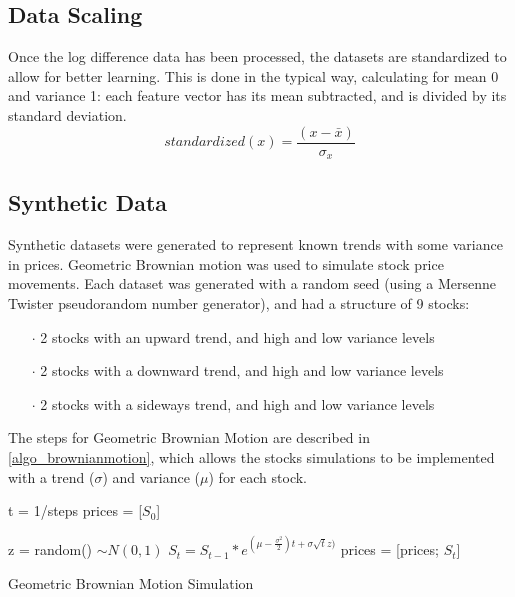 \documentclass[a4paper,latin]{paper}
\begin{document}
\subsection{Data Scaling}\label{data_scaling}
Once the log difference data has been processed, the datasets are standardized to allow for better learning. This is done in the typical way, calculating for mean 0 and variance 1: each feature vector has its mean subtracted, and is divided by its standard deviation.
\begin{equation}
\textit{standardized}(x) = \frac{(x - \bar{x}) }{\sigma_x}
\end{equation}

\subsection{Synthetic Data}\label{data_synthetic}

Synthetic datasets were generated to represent known trends with some variance in prices. Geometric Brownian motion was used to simulate stock price movements. Each dataset was generated with a random seed (using a Mersenne Twister pseudorandom number generator), and had a structure of 9 stocks:

\begin{itemize}
	\item [$\cdot$] 2 stocks with an upward trend, and high and low variance levels
	\item [$\cdot$] 2 stocks with a downward trend, and high and low variance levels
	\item [$\cdot$] 2 stocks with a sideways trend, and high and low variance levels
\end{itemize}

The steps for Geometric Brownian Motion are described in \ref{algo_brownianmotion}, which allows the stocks simulations to be implemented with a trend ($\sigma$) and variance ($\mu$) for each stock.\newline

\begin{algorithm}[H]

	t = 1/steps\;
	prices = [$S_0$]\;

	{
		z = random()  $\sim N(0,1)$\;
		$S_t = S_{t-1}*e^{(\mu - \frac {\sigma^2}{2})t + \sigma  \sqrt{t}  z)}$\;
		prices = [prices; $S_t$]\;
	}
	\label{algo_brownianmotion}
	\caption{Geometric Brownian Motion Simulation}
\end{algorithm}
\end{document}
